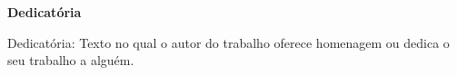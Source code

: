 \def\textoDedicatoria{
  Dedicatória: Texto no qual o autor
  do trabalho oferece homenagem ou
  dedica o seu trabalho a alguém.
}

\begin{dedicatoria}
  \textbf{Dedicatória}
  \vfill
  \hfill{}
  \parbox{6cm}{
    \begin{flushright}
      \textoDedicatoria\
    \end{flushright}
      }
\end{dedicatoria}